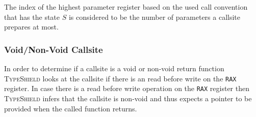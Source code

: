 %
%
%

The index of the highest parameter register based on the used call convention that has the state $S$ is considered to be the number of parameters a callsite prepares at most.

\subsubsection{Void/Non-Void Callsite}
In order to determine if a callsite is a void or non-void return function
\textsc{TypeShield} looks at the callsite if there is an read before write on the \texttt{RAX} register. 
In case there is a read before write operation on the \texttt{RAX} register then
\textsc{TypeShield} infers that the callsite is non-void and thus expects a pointer to be provided 
when the called function returns.


